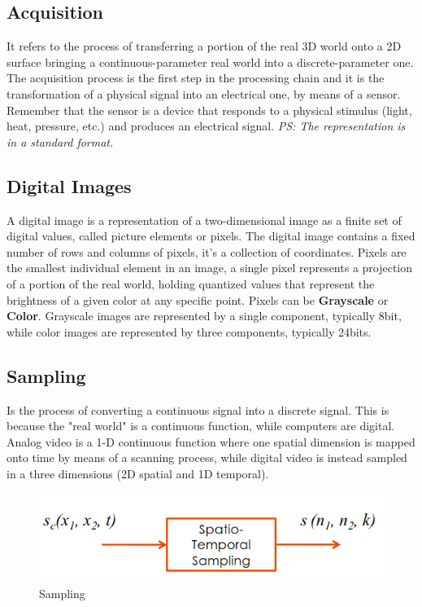 \subsection{Acquisition}
It refers to the process of transferring a portion of the real 3D world onto a 2D surface bringing a continuous-parameter real world into a discrete-parameter one. 
The acquisition process is the first step in the processing chain and it is the transformation of a physical signal into an electrical one, by means of a sensor. 
Remember that the sensor is a device that responds to a physical stimulus (light, heat, pressure, etc.) and produces an electrical signal. 
\textit{PS: The representation is in a standard format.}
\\
\subsection{Digital Images}
A digital image is a representation of a two-dimensional image as a finite set of digital values, called picture elements or pixels. The digital image contains a fixed number of rows and columns of pixels, it's a collection of coordinates. Pixels are the smallest individual element in an image, a single pixel represents a projection of a portion of the real world, holding quantized values that represent the brightness of a given color at any specific point. Pixels can be \textbf{Grayscale} or \textbf{Color}. 
Grayscale images are represented by a single component, typically 8bit, while color images are represented by three components, typically 24bits.
\\
\subsection{Sampling}
Is the process of converting a continuous signal into a discrete signal. This is because the "real world" is a continuous function, while computers are digital. Analog video is a 1-D continuous function where one spatial dimension is mapped onto time by means of a scanning process, while digital video is instead sampled in a three dimensions (2D spatial and 1D temporal).
\\
\begin{figure}[h]
    \centering
    \includegraphics[scale=0.5]{Figures/Sampling.png}
    \caption{Sampling}
    \label{fig:enter-label}
\end{figure}

